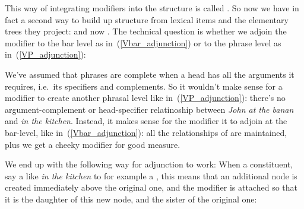 \documentclass{article}
\begin{document}
This way of integrating modifiers into the structure is called .
So now we have in fact a second way to build up structure from lexical items and the elementary trees they project:   and now . %
The technical question is whether we adjoin the modifier to the bar level as in~(\ref{Vbar_adjunction}) or to the phrase level as in~(\ref{VP_adjunction}):
\begin{exe}
\end{exe}

We've assumed that phrases are complete when a head has all the arguments it requires, i.e.~its specifiers and complements. So it wouldn't make sense for a modifier to create another phrasal level like in~(\ref{VP_adjunction}): there's no argument-complement or head-specifier relatinoship between \emph{John at the banan} and \emph{in the kitchen}. Instead, it makes sense for the modifier it to adjoin at the bar-level, like in~(\ref{Vbar_adjunction}): all the relationships of  are maintained, plus we get a cheeky modifier for good measure.

We end up with the following way for adjunction to work: When a constituent, say a  like \emph{in the kitchen}  to for example a , this means that an additional  node is created immediately above the original one, and the modifier is attached so that it is the daughter of this new  node, and the sister of the original one: 
\end{document}
